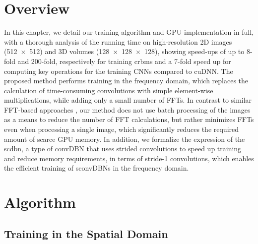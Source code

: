 \section{Overview}

In this chapter, we detail our training algorithm and GPU implementation in
full, with a thorough analysis of the running time on high-resolution 2D images
(\num{512x512}) and 3D volumes (\num{128x128x128}), showing speed-ups of up to
8-fold and 200-fold, respectively for training \glspl{crbm} and a 7-fold speed
up for computing key operations for the training CNNs compared to cuDNN. The
proposed method performs training in the frequency domain, which replaces the
calculation of time-consuming convolutions with simple element-wise
multiplications, while adding only a small number of FFTs. In contrast to
similar FFT-based approaches \citep[e.g.,][]{mathieu2013}, our method does not
use batch processing of the images as a means to reduce the number of FFT
calculations, but rather minimizes FFTs even when processing a single image,
which significantly reduces the required amount of scarce GPU memory.
In addition, we formalize the expression of the \gls{scdbn}, a type of convDBN
that uses strided convolutions to speed up training and reduce memory
requirements, in terms of stride-1 convolutions, which enables the efficient
training of sconvDBNs in the frequency domain.


\section{Algorithm}


\subsection[Training in the spatial domain]{Training in the Spatial Domain}

